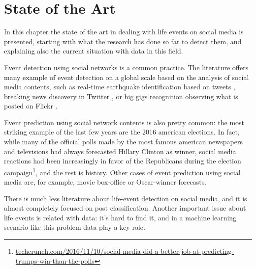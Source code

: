 \chapter{State of the Art}
\label{cha:soa}

In this chapter the state of the art in dealing with life events on social media is presented, starting with what the research has done so far to detect them, and explaining also the current situation with data in this field.

Event detection using social networks is a common practice. The literature offers many example of event detection on a global scale based on the analysis of social media contents, such as real-time earthquake identification based on tweets \cite{sakaki2010earthquake}, breaking news discovery in Twitter \cite{jackoway2011identification, phuvipadawat2010breaking}, or big gigs recognition observing what is posted on Flickr \cite{liu2011using}.

Event prediction using social network contents is also pretty common: the most striking example of the last few years are the 2016 american elections. In fact, while many of the official polls made by the most famous american newspapers and televisions had always forecasted Hillary Clinton as winner, social media reactions had been increasingly in favor of the Republicans during the election campaign\footnote{\url{techcrunch.com/2016/11/10/social-media-did-a-better-job-at-predicting-trumps-win-than-the-polls}}, and the rest is history. Other cases of event prediction using social media are, for example, movie box-office \cite{asur2010predicting} or Oscar-winner forecasts.

There is much less literature about life-event detection on social media, and it is almost completely focused on post classification. Another important issue about life events is related with data: it's hard to find it, and in a machine learning scenario like this problem data play a key role.

